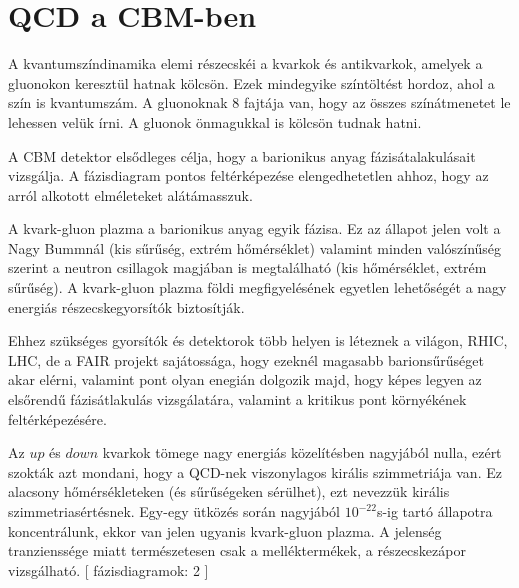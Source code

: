 \documentclass[a4paper,12pt]{article}
\begin{document}
\section{QCD a CBM-ben}
\par A kvantumszíndinamika elemi részecskéi a kvarkok és antikvarkok, amelyek a gluonokon keresztül hatnak kölcsön. Ezek mindegyike színtöltést hordoz, ahol a szín is kvantumszám. A gluonoknak 8 fajtája van, hogy az összes színátmenetet le lehessen velük írni.  A gluonok önmagukkal is kölcsön tudnak hatni.
\par A CBM detektor elsődleges célja, hogy a barionikus anyag fázisátalakulásait vizsgálja. A fázisdiagram pontos feltérképezése elengedhetetlen ahhoz, hogy az arról alkotott elméleteket alátámasszuk.
\par A kvark-gluon plazma a barionikus anyag egyik fázisa. Ez az állapot jelen volt a Nagy Bummnál (kis sűrűség, extrém hőmérséklet) valamint minden valószínűség szerint a neutron csillagok magjában is megtalálható (kis hőmérséklet, extrém sűrűség).  A kvark-gluon plazma földi megfigyelésének egyetlen lehetőségét a nagy energiás részecskegyorsítók biztosítják. 
\par Ehhez szükséges gyorsítók és detektorok több helyen is léteznek a világon, RHIC, LHC, de a FAIR projekt sajátossága, hogy ezeknél magasabb barionsűrűséget akar elérni, valamint pont olyan enegián dolgozik majd, hogy képes legyen az elsőrendű fázisátlakulás vizsgálatára, valamint a kritikus pont környékének feltérképezésére.
\par Az $up$ és $down$ kvarkok tömege nagy energiás közelítésben nagyjából nulla, ezért szokták azt mondani, hogy a QCD-nek viszonylagos királis szimmetriája van. Ez alacsony hőmérsékleteken (és sűrűségeken sérülhet), ezt nevezzük királis szimmetriasértésnek. Egy-egy ütközés során nagyjából $10^{-22}$s-ig tartó állapotra koncentrálunk, ekkor van jelen ugyanis kvark-gluon plazma. A jelenség tranzienssége miatt természetesen csak a melléktermékek, a részecskezápor vizsgálható. [ fázisdiagramok: 2 ]
\end{document}
